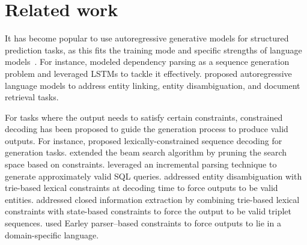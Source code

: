 

\section{Related work}\label{sec:background_and_related_work}

%
It has become popular to use autoregressive generative models for structured prediction tasks, as this fits the training mode and specific strengths of language models~\cite{NIPS2015_grammar, athiwaratkun-etal-2020-augmented, liu-etal-2022-autoregressive, Paolini2021}.
%
For instance, \citet{NIPS2015_grammar} modeled dependency parsing as a sequence generation problem and leveraged LSTMs to tackle it effectively.
\citet{decao2021autoregressive} proposed autoregressive language models to address entity linking, entity disambiguation, and document retrieval tasks.

For tasks where the output needs to satisfy certain constraints, constrained decoding has been proposed to guide the generation process to produce valid outputs.
%
For instance, \citet{hokamp-liu-2017-lexically, hu-etal-2019-improved, post-vilar-2018-fast} proposed lexically\hyp constrained sequence decoding for generation tasks.
%
\citet{anderson-etal-2017-guided} extended the beam search algorithm by pruning the search space based on constraints.
%
\citet{scholak-etal-2021-picard} leveraged an incremental parsing technique to generate approximately valid SQL queries.
%
\citet{decao2021autoregressive} addressed entity disambiguation with trie-based lexical  constraints at decoding time to force outputs to be valid entities.
\citet{josifoski-etal-2022-genie} 
addressed closed information extraction by combining trie-based lexical constraints with state-based constraints to force the output to be valid triplet sequences.
\citet{bailin_wang2023grammar} used Earley parser--based constraints to force outputs to lie in a domain-specific language.

